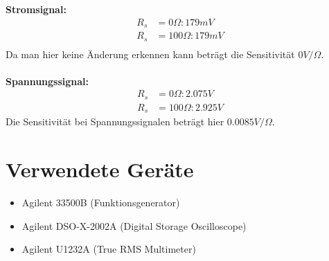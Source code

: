 \documentclass[a4paper,12pt]{article}
\begin{document}
	\newpage
	\noindent
	\textbf{Stromsignal:}
	\begin{align*}
		R_s &= 0\Omega : 179mV \\
		R_s &= 100\Omega: 179mV \\
	\end{align*}
	Da man hier keine Änderung erkennen kann beträgt die Sensitivität $0 V/\Omega$. \\ \\
	\textbf{Spannungssignal:}
	\begin{align*}
		R_s &= 0\Omega : 2.075V \\
		R_s &= 100\Omega : 2.925V
	\end{align*}
	Die Sensitivität bei Spannungssignalen beträgt hier $0.0085 V/\Omega$.
	\section{Verwendete Geräte}
	\begin{itemize}
		\item Agilent 33500B (Funktionsgenerator)
		\item Agilent DSO-X-2002A (Digital Storage Oscilloscope)
		\item Agilent U1232A (True RMS Multimeter)
	\end{itemize}
	\newpage
	\listoffigures
	
	\newpage
	\listoftables
\end{document}

